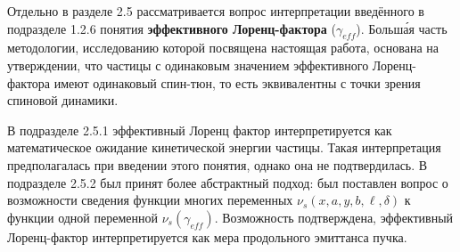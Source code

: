 Отдельно в разделе 2.5 рассматривается вопрос интерпретации введённого в подразделе 1.2.6 понятия 
\textbf{эффективного Лоренц-фактора} ($\gamma_{eff}$). 
%
Больш\'{а}я часть методологии, исследованию которой посвящена настоящая работа, основана на утверждении, что 
частицы с одинаковым значением эффективного Лоренц-фактора имеют одинаковый спин-тюн, 
то есть эквивалентны с точки зрения спиновой динамики.

В подразделе 2.5.1 эффективный Лоренц фактор интерпретируется как 
математическое ожидание кинетической энергии частицы. Такая интерпретация предполагалась при введении
этого понятия, однако она не подтвердилась. В подразделе 2.5.2 был принят более абстрактный подход: 
был поставлен вопрос о возможности сведения функции многих переменных $\nu_s(x,a,y,b,\ell,\delta)$ 
к функции одной переменной $\nu_s(\gamma_{eff})$. Возможность подтверждена, эффективный Лоренц-фактор
интерпретируется как мера продольного эмиттанса пучка.

